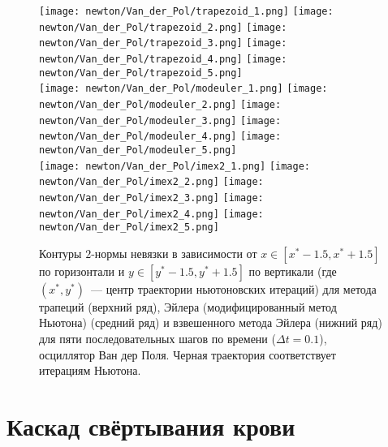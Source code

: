 \begin{figure}[ht!]
	\begin{center}
        \texttt{[image: newton/Van\_der\_Pol/trapezoid\_1.png]}
        \texttt{[image: newton/Van\_der\_Pol/trapezoid\_2.png]}
        \texttt{[image: newton/Van\_der\_Pol/trapezoid\_3.png]}
        \texttt{[image: newton/Van\_der\_Pol/trapezoid\_4.png]}
        \texttt{[image: newton/Van\_der\_Pol/trapezoid\_5.png]}
        \\[4pt]
        \texttt{[image: newton/Van\_der\_Pol/modeuler\_1.png]}
        \texttt{[image: newton/Van\_der\_Pol/modeuler\_2.png]}
        \texttt{[image: newton/Van\_der\_Pol/modeuler\_3.png]}
        \texttt{[image: newton/Van\_der\_Pol/modeuler\_4.png]}
        \texttt{[image: newton/Van\_der\_Pol/modeuler\_5.png]}
        \\[4pt]
        \texttt{[image: newton/Van\_der\_Pol/imex2\_1.png]}
        \texttt{[image: newton/Van\_der\_Pol/imex2\_2.png]}
        \texttt{[image: newton/Van\_der\_Pol/imex2\_3.png]}
        \texttt{[image: newton/Van\_der\_Pol/imex2\_4.png]}
        \texttt{[image: newton/Van\_der\_Pol/imex2\_5.png]}
	\end{center}
    \caption{Контуры $ 2 $-нормы невязки в зависимости от $ x \in [x^* - 1.5, x^* + 1.5] $ по горизонтали
        и $ y \in [y^* - 1.5, y^* + 1.5] $ по вертикали
        (где $ (x^*, y^*) $~--- центр траектории ньютоновских итераций)
        для метода трапеций (верхний ряд), Эйлера (модифицированный метод Ньютона) (средний ряд) и взвешенного метода Эйлера (нижний ряд)
        для пяти последовательных шагов по времени
        ($ \Delta t = 0.1 $), осциллятор Ван дер Поля.
        Черная траектория соответствует итерациям Ньютона.
	}
	\label{fig:Van_der_Pol_residual}
\end{figure}



\section{Каскад свёртывания крови}
\label{sec:blood_coagulation_cascade}

